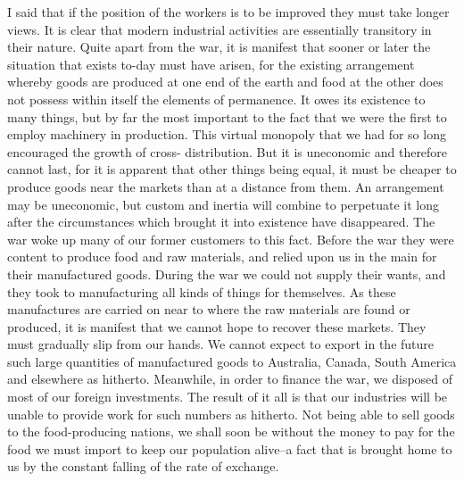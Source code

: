 \documentclass{book}
\begin{document}
I said that if the position of the workers is to be improved they must take longer views. It is clear that modern industrial activities are essentially transitory in their nature. Quite apart from the war, it is manifest that sooner or later the situation that exists to-day must have arisen, for the existing arrangement whereby goods are produced at one end of the earth and food at the other does not possess within itself the elements of permanence. It owes its existence to many things, but by far the most important to the fact that we were the first to employ machinery in production. This virtual monopoly that we had for so long encouraged the growth of cross- distribution. But it is uneconomic and therefore cannot last, for it is apparent that other things being equal, it must be cheaper to produce goods near the markets than at a distance from them. An arrangement may be uneconomic, but custom and inertia will combine to perpetuate it long after the circumstances which brought it into existence have disappeared. The war woke up many of our former customers to this fact. Before the war they were content to produce food and raw materials, and relied upon us in the main for their manufactured goods. During the war we could not supply their wants, and they took to manufacturing all kinds of things for themselves. As these manufactures are carried on near to where the raw materials are found or produced, it is manifest that we cannot hope to recover these markets. They must gradually slip from our hands. We cannot expect to export in the future such large quantities of manufactured goods to Australia, Canada, South America and elsewhere as hitherto. Meanwhile, in order to finance the war, we disposed of most of our foreign investments. The result of it all is that our industries will be unable to provide work for such numbers as hitherto. Not being able to sell goods to the food-producing nations, we shall soon be without the money to pay for the food we must import to keep our population alive–a fact that is brought home to us by the constant falling of the rate of exchange.
\end{document}
